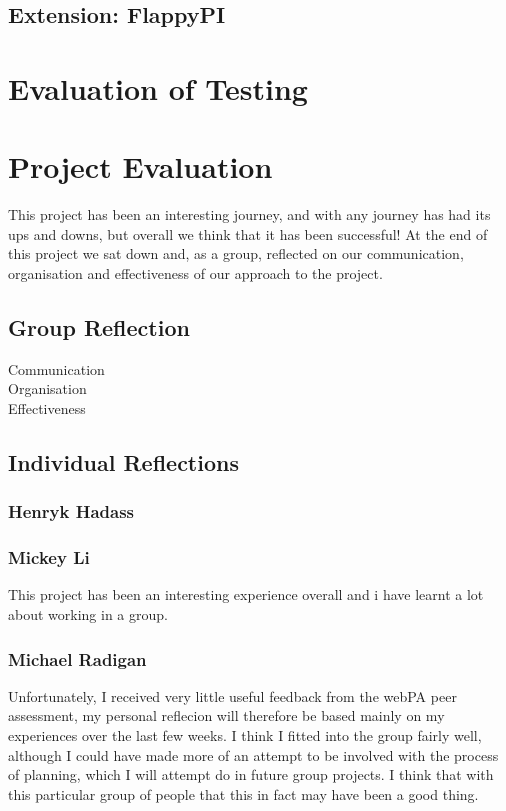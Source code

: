\documentclass[11pt]{article}
\begin{document}
\subsection{Extension: FlappyPI}


\section{Evaluation of Testing}




\section{Project Evaluation}
This project has been an interesting journey, and with any journey has had its ups and downs, but overall we think that it has been successful! At the end of this project we sat down and, as a group, reflected on our communication, organisation and effectiveness of our approach to the project.
\subsection{Group Reflection}

\begin{description}
\item[Communication]


\item[Organisation]


\item[Effectiveness]

\end{description}

\subsection{Individual Reflections}

\subsubsection*{Henryk Hadass}

\subsubsection*{Mickey Li}
This project has been an interesting experience overall and i have learnt a lot about working in a group. 


\subsubsection*{Michael Radigan}
Unfortunately, I received very little useful feedback from the webPA peer
assessment, my personal reflecion will therefore be based mainly on my
experiences over the last few weeks. I think I fitted into the group fairly 
well, although I could have made more of an attempt to be involved with
the process of planning, which I will attempt do in future group projects.
I think that with this particular group of people that this in fact may have
been a good thing.
\end{document}
